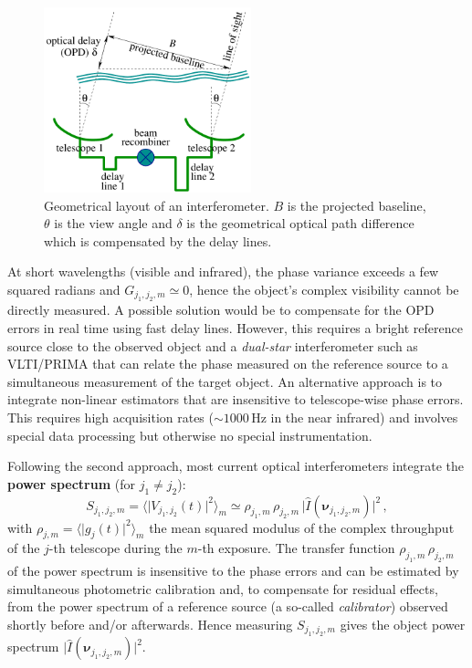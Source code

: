 \documentclass{article}
\newcommand{\vocab}[1]{\textbf{#1}}
\newcommand{\V}[1]{\boldsymbol{#1}}      %
\newcommand{\FT}[1]{\hat{#1}}            %
\newcommand{\abs}[1]{\vert #1\vert}
\newcommand{\avg}[1]{\langle #1\rangle}
\newcommand{\ComplexVis}{V}
\newcommand{\Powerspectrum}{S}
\newcommand{\Freq}{\nu}               %
\newcommand{\VFreq}{\V{\Freq}}
\newcommand{\Dirn}{\theta}            %
\newcommand{\Image}{I}
\newcommand{\Gain}{g}
\newcommand{\GainSquaredModulus}{\rho}
\newcommand{\OPD}{\delta}
\newcommand{\OTF}{G} %
\begin{document}
\begin{figure}[!t]
  \centering
  \includegraphics[width=60mm]{fig1}
  \caption{Geometrical layout of an interferometer. $B$ is the projected
    baseline, $\Dirn$ is the view angle and $\OPD$ is the geometrical optical
    path difference which is compensated by the delay lines.}
  \label{fig:layout}
\end{figure}

At short wavelengths (visible and infrared), the phase variance exceeds a few
squared radians and $\OTF_{j_1,j_2,m}\simeq0$, hence the object's complex
visibility cannot be directly measured.  A possible solution would be to
compensate for the OPD errors in real time using fast delay lines.  However,
this requires a bright reference source close to the observed object
and a \emph{dual-star} interferometer such as VLTI/PRIMA
\citep{Delplancke_at_al-2003-Prima} that can relate the phase measured on
the reference source to a simultaneous measurement of the target object. An
alternative approach is to integrate non-linear estimators that are
insensitive to telescope-wise phase errors.  This requires high acquisition
rates ($\sim1000\,\mathrm{Hz}$ in the near infrared) and involves special
data processing but otherwise no special instrumentation.

Following the second approach, most current optical interferometers integrate
the \vocab{power spectrum} (for $j_1\not=j_2$):
\begin{equation}
  \label{eq:mean-powerspectrum}
  \Powerspectrum_{j_1,j_2,m}
  = \avg{\abs{\ComplexVis_{j_1,j_2}(t)}^2}_m
  \simeq \GainSquaredModulus_{j_1,m} \,
         \GainSquaredModulus_{j_2,m} \,
         \abs{\FT{\Image}(\VFreq_{j_1,j_2,m})}^2 \,,
\end{equation}
with $\GainSquaredModulus_{j,m} = \avg{\abs{\Gain_{j}(t)}^2}_m$ the mean
squared modulus of the complex throughput of the $j$-th telescope during the
$m$-th exposure.  The transfer function $\GainSquaredModulus_{j_1,m} \,
\GainSquaredModulus_{j_2,m}$ of the power spectrum is insensitive to the phase
errors and can be estimated by simultaneous photometric calibration and, to
compensate for residual effects, from the power spectrum of a reference source
(a so-called \emph{calibrator}) observed shortly before and/or afterwards.
Hence measuring $\Powerspectrum_{j_1,j_2,m}$ gives the object power spectrum
$\abs{\FT{\Image}(\VFreq_{j_1,j_2,m})}^2$.
\end{document}
